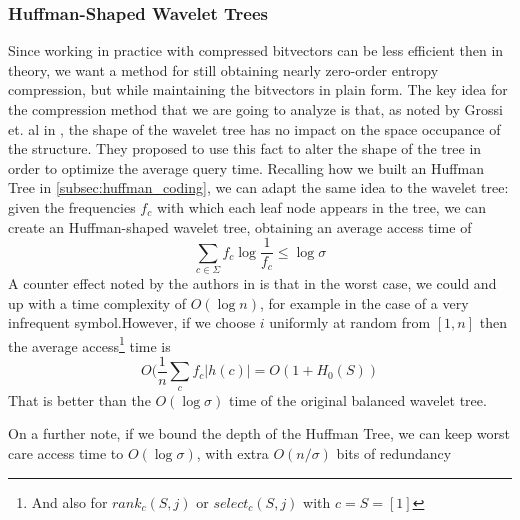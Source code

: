 \subsubsection{Huffman-Shaped Wavelet Trees} \label{subsec:huffman_shaped_wavelet_trees}
Since working in practice with compressed bitvectors can be less efficient then in theory, we want a method for still obtaining nearly zero-order entropy compression, but while maintaining the bitvectors in plain form. The key idea for the compression method that we are going to analyze is that, as noted by Grossi et. al in \cite{grossi2004indexing}, the shape of the wavelet tree has no impact on the space occupance of the structure. They proposed to use this fact to alter the shape of the tree in order to optimize the average query time. Recalling how we built an Huffman Tree in \ref{subsec:huffman_coding}, we can adapt the same idea to the wavelet tree: given the frequencies $f_c$ with which each leaf node appears in the tree, we can create an Huffman-shaped wavelet tree, obtaining an average access time of
\begin{equation}
    \sum_{c \in \Sigma} f_c \log \frac{1}{f_c} \leq \log \sigma
\end{equation}
A counter effect noted by the authors in \cite{grossi2004indexing} is that in the worst case, we could and up with a time complexity of $O(\log n)$, for example in the case of a very infrequent symbol.However, if we choose $i$ uniformly at random from $[1, n]$ then the average access\footnote{And also for $rank_c(S,j)$ or $select_c(S,j)$ with $c = S=[1]$} time is
\begin{equation}
    O(\frac{1}{n} \sum_c f_c |h(c)| = O(1 + H_0(S))
\end{equation}
That is better than the $O(\log \sigma)$ time of the original balanced wavelet tree.

\begin{remark}
    On a further note, if we bound the depth of the Huffman Tree, we can keep worst care access time to $O(\log \sigma)$, with extra $O(n/\sigma)$ bits of redundancy
\end{remark}

